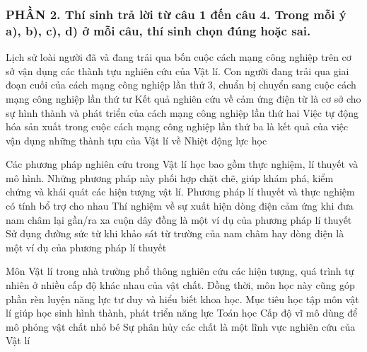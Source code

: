 \subsubsection*{PHẦN 2. Thí sinh trả lời từ câu 1 đến câu 4. Trong mỗi ý a), b), c), d) ở mỗi câu, thí sinh chọn đúng hoặc sai.}
\setcounter{ex}{0}
\begin{ex}%
Lịch sử loài người đã và đang trải qua bốn cuộc cách mạng công nghiệp trên cơ sở vận dụng các thành tựu nghiên cứu của Vật lí.
{Con người đang trải qua giai đoạn cuối của cách mạng công nghiệp lần thứ 3, chuẩn bị chuyển sang cuộc cách mạng công nghiệp lần thứ tư} 
{\True Kết quả nghiên cứu về cảm ứng điện từ là cơ sở cho sự hình thành và phát triển của cách mạng công nghiệp lần thứ hai} 
{Việc tự động hóa sản xuất trong cuộc cách mạng công nghiệp lần thứ ba là kết quả của việc vận dụng những thành tựu của Vật lí về Nhiệt động lực học} 
\loigiai{ 
\begin{itemchoice}
\itemch
\itemch
\itemch
\itemch
\end{itemchoice}
}
\end{ex}
\begin{ex}%
Các phương pháp nghiên cứu trong Vật lí học bao gồm thực nghiệm, lí thuyết và mô hình. Những phương pháp này phối hợp chặt chẽ, giúp khám phá, kiểm chứng và khái quát các hiện tượng vật lí.
{\True Phương pháp lí thuyết và thực nghiệm có tính bổ trợ cho nhau} 
{Thí nghiệm về sự xuất hiện dòng điện cảm ứng khi đưa nam châm lại gần/ra xa cuộn dây đồng là một ví dụ của phương pháp lí thuyết} 
{Sử dụng đường sức từ khi khảo sát từ trường của nam châm hay dòng điện là một ví dụ của phương pháp lí thuyết} 
\loigiai{ 
\begin{itemchoice}
\itemch
\itemch
\itemch
\itemch
\end{itemchoice}
}
\end{ex}
\begin{ex}%
Môn Vật lí trong nhà trường phổ thông nghiên cứu các hiện tượng, quá trình tự nhiên ở nhiều cấp độ khác nhau của vật chất. Đồng thời, môn học này cũng góp phần rèn luyện năng lực tư duy và hiểu biết khoa học.
{Mục tiêu học tập môn vật lí giúp học sinh hình thành, phát triển năng lực Toán học} 
{Cấp độ vĩ mô dùng để mô phỏng vật chất nhỏ bé} 
{Sự phân hủy các chất là một lĩnh vực nghiên cứu của Vật lí} 
\loigiai{ 
\begin{itemchoice}
\itemch
\itemch
\itemch
\itemch
\end{itemchoice}
}
\end{ex}

